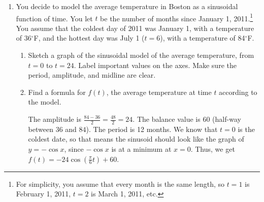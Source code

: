 \documentclass{article}
\begin{document}
\begin{enumerate}
\item \label{spring2012-mb-midterm1-1} 

  You decide to model the average temperature in Boston as a sinusoidal function of
  time.  You let $t$ be the number of months since January 1,
  2011.\footnote{For simplicity, you assume that every month is the same length, so $t
    = 1$ is February 1, 2011, $t = 2$ is March 1, 2011, etc.}  You assume that the coldest day of 2011 was January 1, with a
  temperature of 36$^\circ$F, and the hottest day was July 1 ($t = 6$),
  with a temperature of 84$^\circ$F.
  \begin{enumerate}
  \item
    \begin{problem}[\stretch{1}]
      Sketch a graph of the sinusoidal model of the average temperature, from
      $t=0$ to $t=24$.  Label important values on the axes. Make sure the period, amplitude, and midline are clear.
    \end{problem}

    \begin{solution}
      \begin{center}
      \end{center}
    \end{solution}

  \item
    \begin{problem}[\stretch{0.5}]
      Find a formula for $f(t)$, the average temperature at time $t$ according to
      the model.
    \end{problem}

    \begin{solution}
      The amplitude is $\frac{84-36}{2}=\frac{48}{2}=24$.  The balance
      value is $60$ (half-way between $36$ and $84$).  The period is 12
      months.  We know that $t=0$ is the coldest date, so that means the
      sinusoid should look like the graph of $y=-\cos x$, since $-\cos x$
      is at a minimum at $x=0$. Thus, we get $f(t)=\boxed{-24
        \cos\left(\frac{\pi}{6}t\right)+60}.$
    \end{solution}


\end{enumerate}
\end{enumerate}
\end{document}
